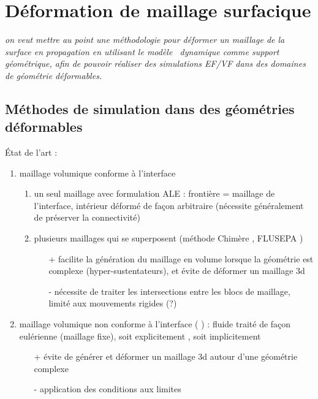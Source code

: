 \chapter{Déformation de maillage surfacique}

\textit{on veut mettre au point une méthodologie pour déformer un maillage de la surface en propagation en utilisant le modèle \brep\ dynamique comme support géométrique, afin de pouvoir réaliser des simulations EF/VF dans des domaines de géométrie déformables.}

\section{Méthodes de simulation dans des géométries déformables}
État de l'art :
\begin{enumerate}
	\item maillage volumique conforme à l'interface
	\begin{enumerate}
		\item\label{item:ale} un seul maillage  avec formulation ALE : frontière = maillage de l'interface, intérieur déformé de façon arbitraire (nécessite généralement de préserver la connectivité)
		\item plusieurs maillages  qui se superposent (méthode Chimère \cite{meakin1989, wang2000}, FLUSEPA \cite{brenner1991} ) 
		\begin{itemize}
			\item[+] facilite la génération du maillage en volume lorsque la géométrie est complexe (\eg hyper-sustentateurs), et évite de déformer un maillage 3d
			\item[-] nécessite de traiter les intersections entre les blocs de maillage, limité aux mouvements rigides (?)
		\end{itemize}
	\end{enumerate}
	\item maillage volumique non conforme à l'interface ( \cite{peskin2002}) : fluide traité de façon eulérienne (maillage fixe), soit explicitement \cite{wang2012, hovnanian2012}{\color{gray},  soit implicitement \cite{bruchon2009}}
	\begin{itemize}
		\item[+] évite de générer et déformer un maillage 3d autour d'une géométrie complexe
		\item[-] application des conditions aux limites
	\end{itemize}
\end{enumerate}

